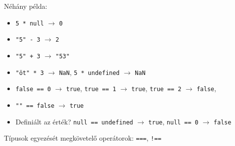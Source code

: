 \documentclass[usenames,dvipsnames,aspectratio=169]{beamer}
\begin{document}
\begin{frame}
    Néhány példa:
    \begin{itemize}
        \item \texttt{5 * null} $\to$ \texttt{0}
        \item \texttt{"5" - 3} $\to$ \texttt{2}
        \item \texttt{"5" + 3} $\to$ \texttt{"53"}
        \item \texttt{"öt" * 3} $\to$ \texttt{NaN}, \texttt{5 * undefined} $\to$ \texttt{NaN}
        \item \texttt{false == 0} $\to$ \texttt{true}, \texttt{true == 1} $\to$ \texttt{true}, \texttt{true == 2} $\to$ \texttt{false}, \item \texttt{"" == false} $\to$ \texttt{true}
        \item Definiált az érték? \texttt{null == undefined} $\to$ \texttt{true}, \texttt{null == 0} $\to$ \texttt{false}
    \end{itemize}
    \vfill
    Típusok egyezését megkövetelő operátorok: \texttt{===}, \texttt{!==}
\end{frame}
\end{document}
